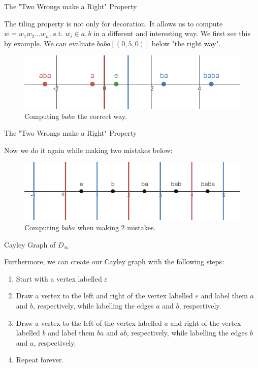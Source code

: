 \documentclass[usenames,dvipsnames]{beamer}
\begin{document}
\begin{frame}{The "Two Wrongs make a Right" Property}

The tiling property is not only for decoration. It allows us to compute $w=w_{1}w_{2}\ldots w_{n}$, s.t.
$w_{i}\in {a,b}$ in a different and interesting way. We first see this by example. We can evaluate
$baba[(0,5,0)]$ below "the right way".

\begin{figure}[h]
    \centering
    \includegraphics[width=1\textwidth]{images/2-03-Computing_baba.png}
    \caption{Computing $baba$ the correct way.}
\end{figure}

\end{frame}

\begin{frame}{The "Two Wrongs make a Right" Property}

Now we do it again while making two mistakes below:

\begin{figure}[h]
    \centering
    \includegraphics[width=1\textwidth]{images/2-04-Wrong_Way.png}
    \caption{Computing $baba$ when making 2 mistakes.}
\end{figure}

\end{frame}

\begin{frame}{Cayley Graph of $D_\infty$}

Furthermore, we can create our Cayley graph with the following steps:  

\begin{enumerate}
  \item Start with a vertex labelled $\varepsilon$
  \item Draw a vertex to the left and right of the vertex labelled $\varepsilon$ and label them $a$ and
  $b$, respectively, while labelling the edges $a$ and $b$, respectively.
  \item Draw a vertex to the left of the vertex labelled $a$ and right of the vertex labelled $b$ and label
  them $ba$ and $ab$, respectively, while labelling the edges $b$ and $a$, respectively.
  \item Repeat forever.
\end{enumerate}

\end{frame}
\end{document}
